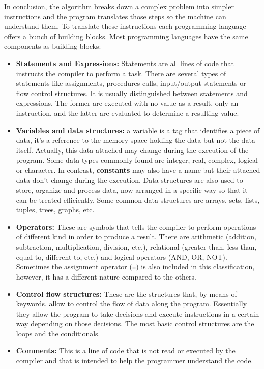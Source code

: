 In conclusion, the algorithm breaks down a complex problem into simpler instructions 
and the program translates those steps so the machine can understand them. 
To translate these instructions each programming language offers a bunch of building blocks.
Most programming languages have the same components as building blocks:
\begin{itemize}[noitemsep]
    \item \textbf{Statements and Expressions:} Statements are all lines of code that instructs the compiler to perform a task.
    There are several types of statements like assignments, procedures calls, input/output statements or flow control structures. 
    It is usually distinguished between statements and expressions. 
    The former are executed with no value as a result, only an instruction, 
    and the latter are evaluated to determine a resulting value.
    
    \item \textbf{Variables and data structures:} a variable is a tag that identifies a piece of data, 
    it's a reference to the memory space holding the data but not the data itself. 
    Actually, this data attached may change during the execution of the program. 
    Some data types commonly found are integer, real, complex, logical or character.
    In contrast, \textbf{constants} may also have a name but their attached data don't change during the execution.
    Data structures are also used to store, organize and process data, 
    now arranged in a specific way so that it can be treated efficiently. 
    Some common data structures are arrays, sets, lists, tuples, trees, graphs, etc.
    
    \item \textbf{Operators:} These are symbols that tells the compiler to perform operations of different kind in order to produce a result.
    There are arithmetic (addition, subtraction, multiplication, division, etc.), 
    relational (greater than, less than, equal to, different to, etc.) and 
    logical operators (AND, OR, NOT). 
    Sometimes the assignment operator (\texttt{=}) is also included in this classification, 
    however, it has a different nature compared to the others. 
    
    \item \textbf{Control flow structures:} These are the structures that, by means of keywords, allow to control the flow of data along the program. 
    Essentially they allow the program to take decisions and execute instructions in a certain way depending on those decisions. 
    The most basic control structures are the loops and the conditionals. 
    
    \item \textbf{Comments:} This is a line of code that is not read or executed by the compiler and 
    that is intended to help the programmer understand the code.
    
\end{itemize}

